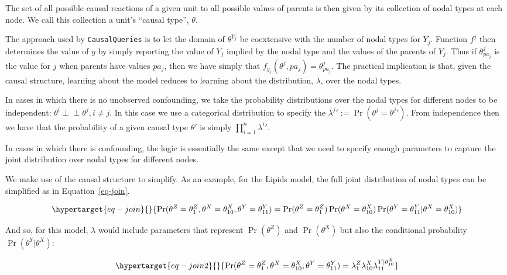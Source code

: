 \documentclass[
  11pt,
  article]{jss}
\begin{document}
The set of all possible causal reactions of a given unit to all possible
values of parents is then given by its collection of nodal types at each
node. We call this collection a unit's ``causal type'', \(\theta\).

The approach used by \texttt{CausalQueries} is to let the domain of
\(\theta^{Y_j}\) be coextensive with the number of nodal types for
\(Y_j\). Function \(f^j\) then determines the value of \(y\) by simply
reporting the value of \(Y_j\) implied by the nodal type and the values
of the parents of \(Y_j\). Thus if \(\theta^j_{pa_j}\) is the value for
\(j\) when parents have values \(pa_j\), then we have simply that
\(f_{y_j}(\theta^{j}, pa_j) = \theta^j_{pa_j}\). The practical
implication is that, given the causal structure, learning about the
model reduces to learning about the distribution, \(\lambda\), over the
nodal types.

In cases in which there is no unobserved confounding, we take the
probability distributions over the nodal types for different nodes to be
independent: \(\theta^i \perp\!\!\! \perp \theta^j, i\neq j\). In this
case we use a categorical distribution to specify the
\({\lambda^j}' := \Pr(\theta^j = {\theta^j}')\). From independence then
we have that the probability of a given causal type \(\theta'\) is
simply \(\prod_{i=1}^n {\lambda^i}'\).

In cases in which there is confounding, the logic is essentially the
same except that we need to specify enough parameters to capture the
joint distribution over nodal types for different nodes.

We make use of the causal structure to simplify. As an example, for the
Lipids model, the full joint distribution of nodal types can be
simplified as in Equation~\ref{eq-join}.

\begin{equation}\protect\hypertarget{eq-join}{}{
\Pr(\theta^Z = \theta^Z_1, \theta^X = \theta^X_{10}, \theta^Y = \theta^Y_{11}) = 
\Pr(\theta^Z = \theta^Z_1)\Pr(\theta^X = \theta^X_{10})\Pr(\theta^Y = \theta^Y_{11}|\theta^X = \theta^X_{10})
}\label{eq-join}\end{equation}

And so, for this model, \(\lambda\) would include parameters that
represent \(\Pr(\theta^Z)\) and \(\Pr(\theta^X)\) but also the
conditional probability \(\Pr(\theta^Y|\theta^X)\):

\begin{equation}\protect\hypertarget{eq-join2}{}{
\Pr(\theta^Z = \theta^Z_1, \theta^X = \theta^X_{10}, \theta^Y = \theta^Y_{11}) = 
\lambda^Z_1\lambda^X_{10}\lambda^{Y|\theta^X_{10}}_{11}
}\label{eq-join2}\end{equation}
\end{document}
